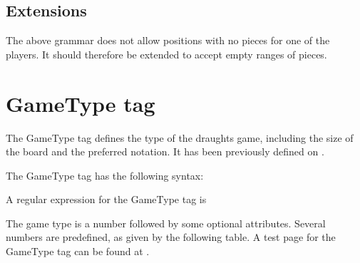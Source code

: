 \documentclass[letterpaper,10pt,english]{sphinxmanual}
\begin{document}
\section{Extensions}
\label{\detokenize{fen:extensions}}
\sphinxAtStartPar
The above grammar does not allow positions with no pieces for one of the
players. It should therefore be extended to accept empty ranges of pieces.

\sphinxstepscope


\chapter{GameType tag}
\label{\detokenize{gametype:gametype-tag}}\label{\detokenize{gametype:gametype-section}}\label{\detokenize{gametype::doc}}
\sphinxAtStartPar
The GameType tag defines the type of the draughts game, including the size of the board
and the preferred notation. It has been previously defined on .

\sphinxAtStartPar
The GameType tag has the following syntax:

\sphinxAtStartPar
{}

\sphinxAtStartPar
A regular expression for the GameType tag is

\begin{sphinxVerbatim}[commandchars=\\\{\}]
\end{sphinxVerbatim}

\sphinxAtStartPar
The game type is a number followed by some optional attributes. Several numbers are
predefined, as given by the following table. A test page for the GameType tag can be
found at .
\end{document}
